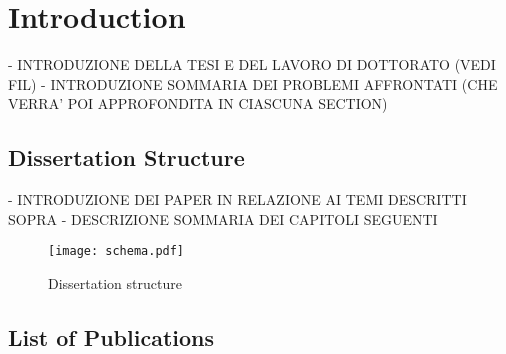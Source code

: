 \chapter{Introduction}
- INTRODUZIONE DELLA TESI E DEL LAVORO DI DOTTORATO (VEDI FIL)
- INTRODUZIONE SOMMARIA DEI PROBLEMI AFFRONTATI (CHE VERRA' POI APPROFONDITA IN CIASCUNA SECTION)
\section{Dissertation Structure}
- INTRODUZIONE DEI PAPER IN RELAZIONE AI TEMI DESCRITTI SOPRA
- DESCRIZIONE SOMMARIA DEI CAPITOLI SEGUENTI
\begin{figure}[t]
	\centering
	\texttt{[image: schema.pdf]}
	\caption{Dissertation structure
	}
	\label{figDissertationSchema}
\end{figure}


\section{List of Publications}